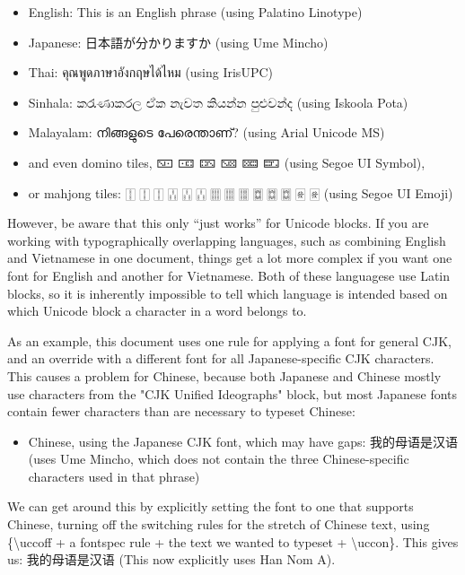 \documentclass{article}
\newenvironment{itemlist}{%
  \begin{itemize}
  \setlength{\itemsep}{0pt}
  \setlength{\parsep}{0pt}
  \setlength{\topsep}{0pt}
  \setlength{\partopsep}{0pt}
  \setlength{\parskip}{0pt}
  \setlength{\labelsep}{5pt}}%
{
  \end{itemize}}
\begin{document}
    \begin{itemlist}
      \item English: This is an English phrase (using Palatino Linotype)
      \item Japanese: 日本語が分かりますか (using Ume Mincho)
      \item Thai: คุณพูดภาษาอังกฤษได้ไหม (using IrisUPC)
      \item Sinhala: කරැණාකරල ඒක නැවත කියන්න පුළුවන්ද (using Iskoola Pota)
      \item Malayalam: നിങ്ങളുടെ പേരെന്താണ്? (using Arial Unicode MS)
      \item and even domino tiles, 🁇 🀼 🁐 🁋 🁚 🁝 (using Segoe UI Symbol),
      \item or mahjong tiles: 🀑 🀑 🀑 🀒 🀒 🀒 🀕 🀕 🀕 🀗 🀗 🀗 🀅 🀅 (using Segoe UI Emoji)
    \end{itemlist}

    However, be aware that this only “just works” for Unicode blocks. If you are working with typographically overlapping languages, such as combining English and Vietnamese in one document, things get a lot more complex if you want one font for English and another for Vietnamese. Both of these languagese use Latin blocks, so it is inherently impossible to tell which language is intended based on which Unicode block a character in a word belongs to.

    As an example, this document uses one rule for applying a font for general CJK, and an override with a different font for all Japanese-specific CJK characters. This causes a problem for Chinese, because both Japanese and Chinese mostly use characters from the "CJK Unified Ideographs" block, but most Japanese fonts contain fewer characters than are necessary to typeset Chinese:

    \begin{itemlist}
      \item Chinese, using the Japanese CJK font, which may have gaps: 我的母语是汉语 (uses Ume Mincho, which does not contain the three Chinese-specific characters used in that phrase)
    \end{itemlist}

  We can get around this by explicitly setting the font to one that supports Chinese, turning off the switching rules for the stretch of Chinese text, using \{\textbackslash uccoff + a fontspec rule + the text we wanted to typeset + \textbackslash uccon\}. This gives us: {\uccoff {} 我的母语是汉语 \uccon} (This now explicitly uses Han Nom A).
\end{document}
